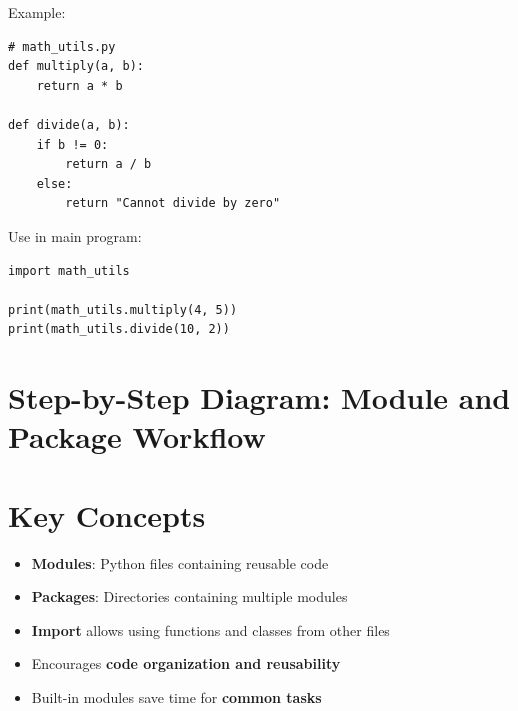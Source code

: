 Example:

\begin{verbatim}
# math_utils.py
def multiply(a, b):
    return a * b

def divide(a, b):
    if b != 0:
        return a / b
    else:
        return "Cannot divide by zero"
\end{verbatim}

Use in main program:

\begin{verbatim}
import math_utils

print(math_utils.multiply(4, 5))
print(math_utils.divide(10, 2))
\end{verbatim}

\section{Step-by-Step Diagram: Module and Package Workflow}

\begin{center}
\end{center}

\section{Key Concepts}

\begin{itemize}
    \item \textbf{Modules}: Python files containing reusable code  
    \item \textbf{Packages}: Directories containing multiple modules  
    \item \textbf{Import} allows using functions and classes from other files  
    \item Encourages \textbf{code organization and reusability}  
    \item Built-in modules save time for \textbf{common tasks}  
\end{itemize}

